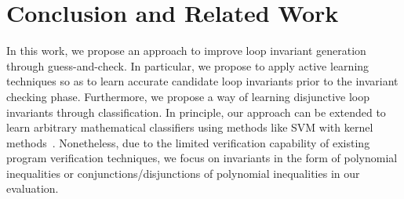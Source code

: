 
\section{Conclusion and Related Work} %
\label{sec:related}
In this work, we propose an approach to improve loop invariant generation through guess-and-check. In particular, we propose to apply active learning techniques so as to learn accurate candidate loop invariants prior to the invariant checking phase. Furthermore, we propose a way of learning disjunctive loop invariants through classification. In principle, our approach can be extended to learn arbitrary mathematical classifiers using methods like SVM with kernel methods~\cite{svm:kernel}.
Nonetheless, due to the limited verification capability of existing program verification techniques, we focus on invariants in the form of polynomial inequalities or conjunctions/disjunctions of polynomial inequalities in our evaluation.



